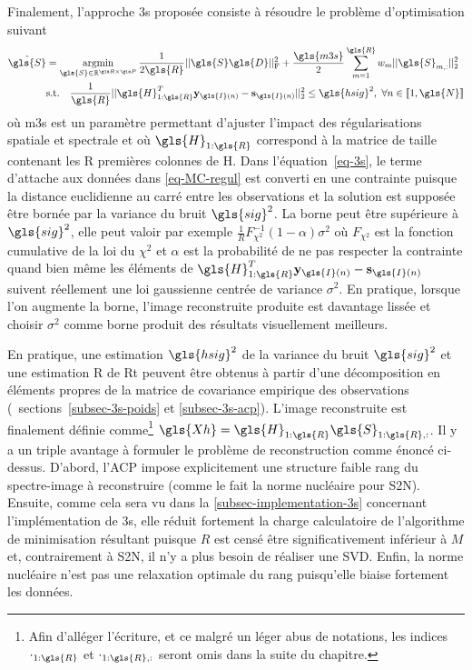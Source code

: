 Finalement, l'approche \gls{3s} proposée consiste à résoudre le problème d'optimisation suivant
\begin{align}
\hat{\gls{S}} &= \argmin_{\gls{S}\in\mathbb{R}^{\taille{R}{P}}}
    \frac{1}{2\gls{R}}\frobnorm{\gls{S} \gls{D}} + 
    \frac{\gls{m3s}}{2}\sum_{m=1}^{\gls{R}} w_{m} \twonorm{\gls{S}_{m,:}} \nonumber \\
%
&\textrm{s.t.}\quad         
    \frac{1}{\gls{R}}\twonorm{\gls{H}_{1:\gls{R}}^T\mathbf{y}_{\gls{I}(n)}-\mathbf{s}_{\gls{I}(n)}}
    \leq\gls{hsig}^2,\ \forall n\in\llbracket 1, \gls{N} \rrbracket \label{eq-3s}
\end{align}
où \gls{m3s} est un paramètre permettant d'ajuster l'impact des régularisations spatiale et spectrale et où $\gls{H}_{1:\gls{R}}$ correspond à la matrice de taille  contenant les \gls{R} premières colonnes de \gls{H}. Dans l'équation~\eqref{eq-3s}, le terme d'attache aux données dans \eqref{eq-MC-regul} est converti en une contrainte puisque la distance euclidienne au carré entre les observations et la solution est supposée être bornée par la variance du bruit $\gls{sig}^2$.
%
La borne peut être supérieure à $\gls{sig}^2$, elle peut valoir par exemple $\frac{1}{R}F_{\chi^2}^{-1}(1-\alpha)\sigma^2$ où $F_{\chi^2}$ est la fonction cumulative de la loi du $\chi^2$ et $\alpha$ est la probabilité de ne pas respecter la contrainte quand bien même les éléments de $\gls{H}_{1:\gls{R}}^T\mathbf{y}_{\gls{I}(n)}-\mathbf{s}_{\gls{I}(n)}$ suivent réellement une loi gaussienne centrée de variance $\sigma^2$. En pratique, lorsque l'on augmente la borne, l'image reconstruite produite est davantage lissée et  choisir $\sigma^2$ comme borne produit des résultats visuellement meilleurs.
%

En pratique, une estimation $\gls{hsig}^2$ de la variance du bruit  $\gls{sig}^2$ et une estimation \gls{R} de \gls{Rt} peuvent être obtenus à partir d'une décomposition en éléments propres de la matrice de covariance empirique des observations (\cf\ sections~\ref{subsec-3s-poids} et \ref{subsec-3s-acp}). L'image reconstruite est finalement définie comme\footnote{Afin d'alléger l'écriture, et ce malgré un léger abus de notations, les indices $\cdot_{1:\gls{R}}$ et $\cdot_{1:\gls{R}, :}$ seront omis dans la suite du chapitre.} $\gls{Xh} = \gls{H}_{1:\gls{R}}\gls{S}_{1:\gls{R}, :}$.
Il y a un triple avantage à formuler le problème de reconstruction comme énoncé ci-dessus. 
%
D'abord, l'ACP impose explicitement une structure faible rang du spectre-image à reconstruire (comme le fait la norme nucléaire pour S2N). Ensuite, comme cela sera vu dans la \cref{subsec-implementation-3s} concernant l'implémentation de \gls{3s}, elle réduit fortement la charge calculatoire de l'algorithme de minimisation résultant puisque $R$ est censé être significativement inférieur à $M$ et, contrairement à S2N, il n’y a plus besoin de réaliser une SVD. Enfin, la norme nucléaire n'est pas une relaxation optimale du rang puisqu'elle biaise fortement les données.


